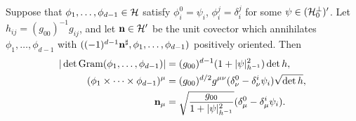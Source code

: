 \begin{lemma} \label{cross product formula}
Suppose that $\phi_1, \dots, \phi_{d - 1} \in \mathcal H$ satisfy $\phi_i^0 = \psi_i$, $\phi_i^j = \delta_i^j$ for some $\psi \in (\mathcal H_0^\perp)'$.
Let $h_{ij} = (g_{00})^{-1} g_{ij}$, and let $\mathbf n \in \mathcal H'$ be the unit covector which annihilates $\phi_1, \dots, \phi_{d - 1}$ with $((-1)^{d - 1}\mathbf n^\sharp, \phi_1, \dots, \phi_{d - 1})$ positively oriented.
Then
\begin{align}
|\det \operatorname{Gram}(\phi_1, \dots, \phi_{d - 1})| &= (g_{00})^{d - 1} (1 + |\psi|_{h^{-1}}^2) \det h, \label{WeinsteinAronszajn} \\
(\phi_1 \times \cdots \times \phi_{d - 1})^\mu &= (g_{00})^{d/2} g^{\mu \nu}(\delta_\nu^0 - \delta^i_\nu \psi_i) \sqrt{\det h}, \label{CrossProduct} \\
\mathbf n_\mu &= \sqrt{\frac{g_{00}}{1 + |\psi|_{h^{-1}}^2}} (\delta^0_\mu - \delta^i_\mu \psi_i) \label{conormal crossproduct}.
\end{align}
\end{lemma}
